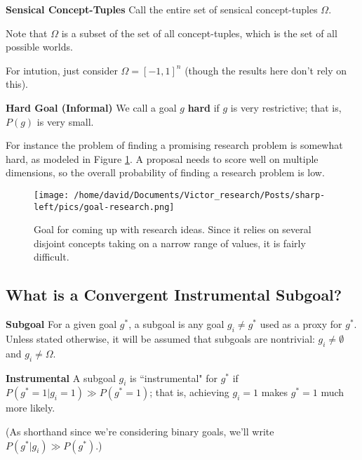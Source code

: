 \documentclass{article}
\begin{document}
\begin{definition}{\textbf{Sensical Concept-Tuples}}
    Call the entire set of sensical concept-tuples $\Omega$.
\end{definition}

Note that $\Omega$ is a subset of the set of all concept-tuples, which is the set of all possible worlds.


For intution, just consider $\Omega=[-1,1]^n$ (though the results here don't rely on this).

\begin{definition}{\textbf{Hard Goal (Informal)}}
    We call a goal $g$ \textbf{hard} if $g$ is very restrictive; that is, $P(g)$ is very small.
\end{definition}

For instance the problem of finding a promising research problem is somewhat hard, as modeled in Figure \ref{fig:goal-research}. A proposal needs to score well on multiple dimensions, so the overall probability of finding a research problem is low.

\begin{figure}[ht]
    \centering
    \texttt{[image: /home/david/Documents/Victor\_research/Posts/sharp-left/pics/goal-research.png]} 
    \caption{Goal for coming up with research ideas. Since it relies on several disjoint concepts taking on a narrow range of values, it is fairly difficult.}
    \label{fig:goal-research} 
\end{figure}

\subsection{What is a Convergent Instrumental Subgoal?}

\begin{definition}{\textbf{Subgoal}}
    For a given goal $g^*$, a subgoal is any goal $g_i \neq g^*$ used as a proxy for $g^*$. Unless stated otherwise, it will be assumed that subgoals are nontrivial: $g_i \neq \emptyset$ and $g_i \neq \Omega$.
\end{definition}

\begin{definition}{\textbf{Instrumental}}
    A subgoal $g_i$ is ``instrumental" for $g^*$ if $P(g^*=1|g_i=1)\gg P(g^*=1)$; that is, achieving $g_i=1$ makes $g^*=1$ much more likely.
\end{definition}

(As shorthand since we're considering binary goals, we'll write $P(g^*|g_i)\gg P(g^*)$.)
\end{document}
